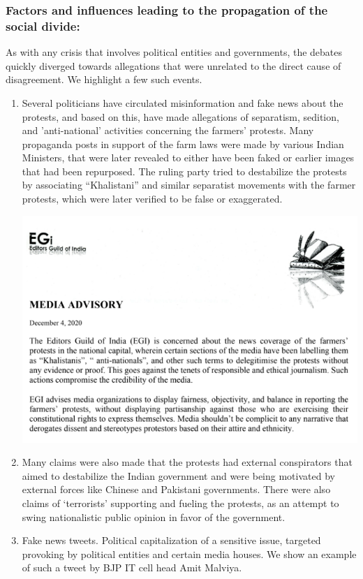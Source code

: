 \documentclass{article}
\begin{document}
\subsubsection{Factors and influences leading to the propagation of the social divide:}
As with any crisis that involves political entities and governments, the debates quickly diverged towards allegations that were unrelated to the direct cause of disagreement. We highlight a few such events.
\begin{enumerate}
    \item Several politicians have circulated misinformation and fake news about the protests, and based on this, have made allegations of separatism, sedition, and 'anti-national' activities concerning the farmers' protests. Many propaganda posts in support of the farm laws were made by various Indian Ministers, that were later revealed to either have been faked or earlier images that had been repurposed. The ruling party tried to destabilize the protests by associating “Khalistani” and similar separatist movements with the farmer protests, which were later verified to be false or exaggerated.\\
    \begin{center}
            \includegraphics[width = 3 in]{pic1.png}
    \end{center}
    \item Many claims were also made that the protests had external conspirators that aimed to destabilize the Indian government and were being motivated by external forces like Chinese and Pakistani governments. There were also claims of ‘terrorists’ supporting and fueling the protests, as an attempt to swing nationalistic public opinion in favor of the government.
    \item Fake news tweets. Political capitalization of a sensitive issue, targeted provoking by political entities and certain media houses. We show an example of such a tweet by BJP IT cell head Amit Malviya. 
    \begin{center}

\end{center}
\end{enumerate}
\end{document}
